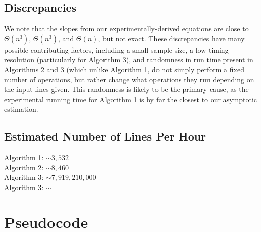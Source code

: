 \documentclass{article}
\begin{document}
\subsection*{Discrepancies}
We note that the slopes from our experimentally-derived equations are close to $\Theta(n^3)$, $\Theta(n^3)$, and $\Theta(n)$, but not exact.  These discrepancies have many possible contributing factors, including a small sample size, a low timing resolution (particularly for Algorithm 3), and randomness in run time present in Algorithms 2 and 3 (which unlike Algorithm 1, do not simply perform a fixed number of operations, but rather change what operations they run depending on the input lines given.  This randomness is likely to be the primary cause, as the experimental running time for Algorithm 1 is by far the closest to our asymptotic estimation.

\subsection*{Estimated Number of Lines Per Hour}
Algorithm 1: $\sim 3,532$\\
Algorithm 2: $\sim 8,460$\\
Algorithm 3: $\sim 7,919,210,000$\\
Algorithm 3: $\sim $\\

\pagebreak

\section*{Pseudocode}

\end{document}
